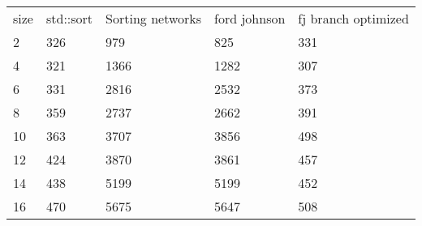 \begin{tabular}{|l|l|l|l|l|}
	size&std::sort&Sorting networks&ford johnson&fj branch optimized\\
	2&326&979&825&331\\
	4&321&1366&1282&307\\
	6&331&2816&2532&373\\
	8&359&2737&2662&391\\
	10&363&3707&3856&498\\
	12&424&3870&3861&457\\
	14&438&5199&5199&452\\
	16&470&5675&5647&508\\
\end{tabular}